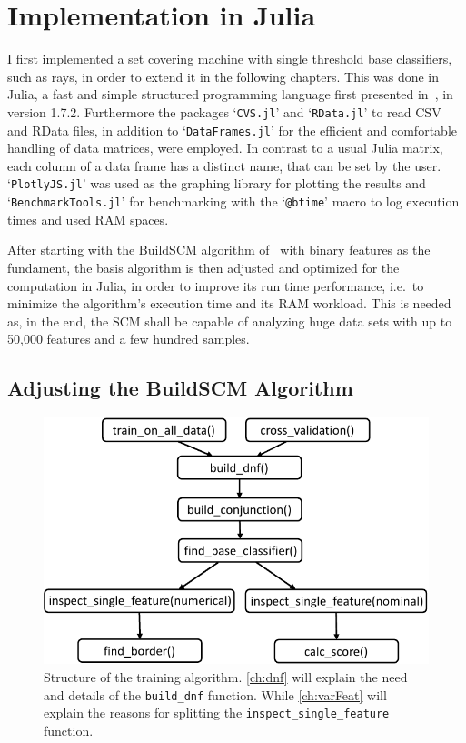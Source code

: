 \chapter{Implementation in Julia}\label{ch:julia}

I first implemented a set covering machine with single threshold base classifiers, such as rays, in order to extend it in the following chapters.
This was done in Julia, a fast and simple structured programming language first presented in~\cite{bezanson}, in version 1.7.2.
Furthermore the packages `\texttt{CVS.jl}' and `\texttt{RData.jl}' to read CSV and RData files, in addition to
`\texttt{DataFrames.jl}' for the efficient and comfortable handling of data matrices, were employed.
In contrast to a usual Julia matrix, each column of a data frame has a distinct name, that can be set by the user.
`\texttt{PlotlyJS.jl}' was used as the graphing library for plotting the results and
`\texttt{BenchmarkTools.jl}' for benchmarking with the `\texttt{@btime}' macro to log execution times and used RAM spaces.

After starting with the BuildSCM algorithm of~\cite{marchand02} with binary features as the fundament,
the basis algorithm is then adjusted and optimized for the computation in Julia, in order to improve its run time performance,
i.e.\ to minimize the algorithm's execution time and its RAM workload.
This is needed as, in the end, the SCM shall be capable of analyzing huge data sets with up to 50,000 features and a few hundred samples.

\section{Adjusting the BuildSCM Algorithm}

\begin{figure}[ht]
    \centering
    \includegraphics[width=0.85\columnwidth]{figures/training_structure.pdf}
    \caption{Structure of the training algorithm. \autoref{ch:dnf} will explain the need and details of the \texttt{build\_dnf} function. While \autoref{ch:varFeat} will explain the reasons for splitting the \texttt{inspect\_single\_feature} function.}\label{fig:training_structure}
\end{figure}

